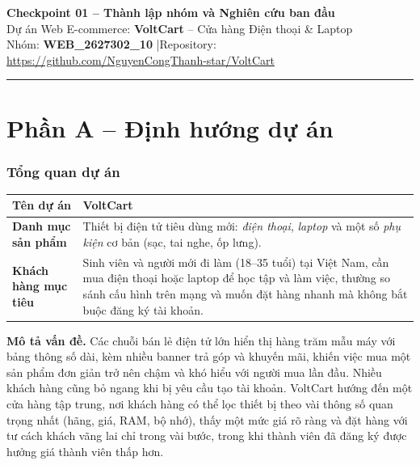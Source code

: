 \documentclass[12pt,a4paper]{article}   %
\newcommand{\TeamName}{WEB\_2627302\_10}
\newcommand{\ProjectName}{VoltCart}
\newcommand{\RepoURL}{\url{https://github.com/NguyenCongThanh-star/VoltCart}}
\begin{document}
\begin{center}
  {\Large\bfseries Checkpoint 01 -- Thành lập nhóm và Nghiên cứu ban đầu}\\[0.4em]
  {\large Dự án Web E-commerce: \textbf{\ProjectName} -- Cửa hàng Điện thoại \& Laptop}\\[0.3em]
  Nhóm: \textbf{\TeamName} \quad|\quad Repository: \RepoURL
\end{center}
\vspace{-0.5em}
\noindent\rule{\linewidth}{0.4pt}

\part*{\large Phần A -- Định hướng dự án}

\section{Tổng quan dự án}

\begin{tabularx}{\linewidth}{|l|Y|}
\hline
\textbf{Tên dự án}            & \ProjectName \\ \hline
\textbf{Danh mục sản phẩm}    & Thiết bị điện tử tiêu dùng mới: \emph{điện thoại}, \emph{laptop}
                                và một số \emph{phụ kiện} cơ bản (sạc, tai nghe, ốp lưng). \\ \hline
\textbf{Khách hàng mục tiêu}  & Sinh viên và người mới đi làm (18--35 tuổi) tại Việt Nam, cần mua
                                điện thoại hoặc laptop để học tập và làm việc, thường so sánh cấu hình
                                trên mạng và muốn đặt hàng nhanh mà không bắt buộc đăng ký tài khoản. \\ \hline
\end{tabularx}

\textbf{Mô tả vấn đề.}
Các chuỗi bán lẻ điện tử lớn hiển thị hàng trăm mẫu máy với bảng thông số dài, kèm nhiều
banner trả góp và khuyến mãi, khiến việc mua một sản phẩm đơn giản trở nên chậm và khó hiểu
với người mua lần đầu. Nhiều khách hàng cũng bỏ ngang khi bị yêu cầu tạo tài khoản.
\ProjectName{} hướng đến một cửa hàng tập trung, nơi khách hàng có thể lọc thiết bị theo
vài thông số quan trọng nhất (hãng, giá, RAM, bộ nhớ), thấy một mức giá rõ ràng và đặt hàng
với tư cách khách vãng lai chỉ trong vài bước, trong khi thành viên đã đăng ký được hưởng giá
thành viên thấp hơn.
\end{document}
